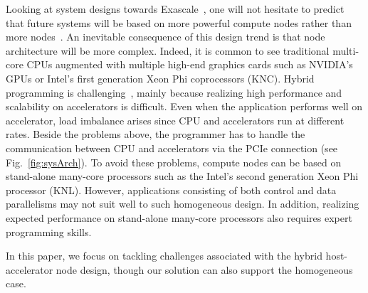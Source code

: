 Looking at system designs towards Exascale~\cite{top500}, one will not hesitate to predict that future systems will be based on more powerful compute nodes rather than more nodes~\cite{Shalf:exascaleChallenges}.  
An inevitable consequence of this design trend is that node architecture will be more complex.
Indeed, it is common to see traditional multi-core CPUs augmented with multiple high-end graphics cards such as NVIDIA's GPUs or Intel's first generation Xeon Phi coprocessors (KNC).
Hybrid programming is challenging~\cite{exascaleRoadMap}, mainly because realizing high performance and scalability on accelerators is difficult.
Even when the application performs well on accelerator, load imbalance arises since CPU and accelerators run at different rates.
Beside the problems above, the programmer has to handle the communication between CPU and accelerators via the PCIe connection (see Fig.~\ref{fig:sysArch}).
To avoid these problems, compute nodes can be based on stand-alone many-core processors such as the Intel's second generation Xeon Phi processor (KNL).
However, applications consisting of both control and data parallelisms may not suit well to such homogeneous design.
In addition, realizing expected performance on stand-alone many-core processors also requires expert programming skills.





In this paper, we focus on tackling challenges associated with the hybrid host-accelerator node design, though our solution can also support the homogeneous case.
